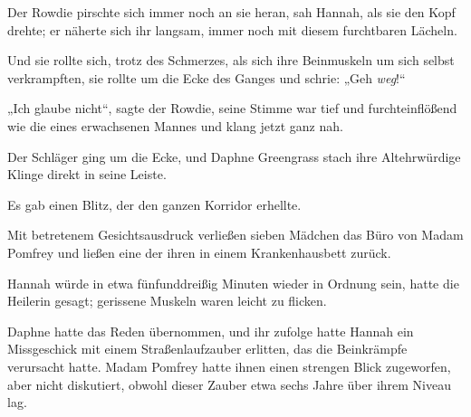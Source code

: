 Der Rowdie pirschte sich immer noch an sie heran, sah Hannah, als sie den Kopf drehte; er näherte sich ihr langsam, immer noch mit diesem furchtbaren Lächeln.

Und sie rollte sich, trotz des Schmerzes, als sich ihre Beinmuskeln um sich selbst verkrampften, sie rollte um die Ecke des Ganges und schrie:
„Geh \emph{weg}!“

„Ich glaube nicht“, sagte der Rowdie, seine Stimme war tief und furchteinflößend wie die eines erwachsenen Mannes und klang jetzt ganz nah.

Der Schläger ging um die Ecke, und Daphne Greengrass stach ihre Altehrwürdige Klinge direkt in seine Leiste.

Es gab einen Blitz, der den ganzen Korridor erhellte.

\later

Mit betretenem Gesichtsausdruck verließen sieben Mädchen das Büro von Madam Pomfrey und ließen eine der ihren in einem Krankenhausbett zurück.

Hannah würde in etwa fünfunddreißig Minuten wieder in Ordnung sein, hatte die Heilerin gesagt; gerissene Muskeln waren leicht zu flicken.

Daphne hatte das Reden übernommen, und ihr zufolge hatte Hannah ein Missgeschick mit einem Straßenlaufzauber erlitten, das die Beinkrämpfe verursacht hatte. Madam Pomfrey hatte ihnen einen strengen Blick zugeworfen, aber nicht diskutiert, obwohl dieser Zauber etwa sechs Jahre über ihrem Niveau lag.

